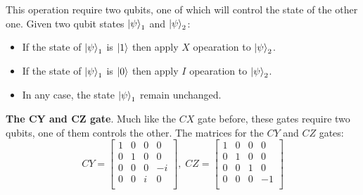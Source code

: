This operation require two qubits, one of which will control the state of the other one.
Given two qubit states $\left\vert{\psi}\right\rangle_1$ and $\left\vert{\psi}\right\rangle_2$:
\begin{itemize}
    \item If the state of $\left\vert{\psi}\right\rangle_1$ is $\left\vert{1}\right\rangle$ then apply $X$ opearation to $\left\vert{\psi}\right\rangle_2$.
    \item If the state of $\left\vert{\psi}\right\rangle_1$ is $\left\vert{0}\right\rangle$ then apply $I$ opearation to $\left\vert{\psi}\right\rangle_2$.
    \item In any case, the state $\left\vert{\psi}\right\rangle_1$ remain unchanged.
\end{itemize}

\textbf{The CY and CZ gate}.
Much like the $CX$ gate before, these gates require two qubits, one of them controls the other.
The matrices for the $CY$ and $CZ$ gates:
\begin{equation}
    CY = \begin{bmatrix}
        1 & 0 & 0 & 0  \\
        0 & 1 & 0 & 0  \\
        0 & 0 & 0 & -i \\
        0 & 0 & i & 0  \\
    \end{bmatrix}, \;
    CZ = \begin{bmatrix}
        1 & 0 & 0 & 0  \\
        0 & 1 & 0 & 0  \\
        0 & 0 & 1 & 0  \\
        0 & 0 & 0 & -1 \\
    \end{bmatrix}
\end{equation}